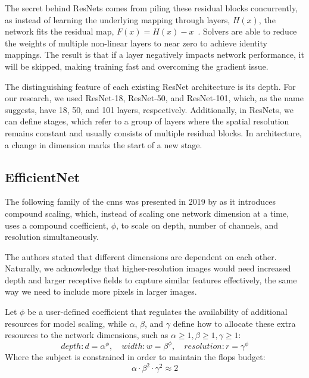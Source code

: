 The secret behind ResNets comes from piling these residual blocks concurrently, as instead of learning the underlying mapping through layers, $H(x)$, the network fits the residual map, $F(x) = H(x) - x$~\cite{shehab_efficient_2021}. Solvers are able to reduce the weights of multiple non-linear layers to near zero to achieve identity mappings. The result is that if a layer negatively impacts network performance, it will be skipped, making training fast and overcoming the gradient issue.

The distinguishing feature of each existing ResNet architecture is its depth. For our research,
we used ResNet-18, ResNet-50, and ResNet-101, which, as the name suggests, have 18, 50, and
101 layers, respectively. Additionally, in ResNets, we can define stages, which refer to a group
of layers where the spatial resolution remains constant and usually consists of multiple residual
blocks. In architecture, a change in dimension marks the start of a new stage.



\subsection{EfficientNet}
The following family of the \acp{cnn} was presented in 2019 by \textcite{tan_efficientnet_2020} as it introduces compound scaling, which, instead of scaling one network dimension at a time, uses a compound coefficient, $\phi$, to scale on depth, number of channels, and resolution simultaneously.

The authors stated that different dimensions are dependent on each other. Naturally, we acknowledge that higher-resolution images would need increased depth and larger receptive fields to capture similar features effectively, the same way we need to include more pixels in larger images.

Let $\phi$ be a user-defined coefficient that regulates the availability of additional resources for model scaling, while $\alpha$, $\beta$, and $\gamma$ define how to allocate these extra resources to the network dimensions, such as $\alpha \geq 1, \beta \geq 1, \gamma \geq 1$:
\begin{equation}
    depth: d = \alpha^{\phi}, \quad width: w = \beta^{\phi}, \quad resolution: r = \gamma^{\phi}
\end{equation}
Where the subject is constrained in order to maintain the \ac{flops} budget:
\begin{equation}\label{eq:flops_constraints}
    \alpha \cdot \beta^2 \cdot \gamma^2 \approx 2
\end{equation}

